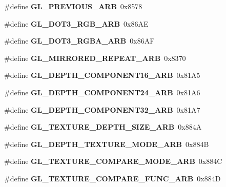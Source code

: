 \begin{DoxyCompactItemize}
\item 
\#define {\bfseries G\+L\+\_\+\+P\+R\+E\+V\+I\+O\+U\+S\+\_\+\+A\+R\+B}~0x8578\label{_s_d_l__opengl_8h_a24a4ee159c9974051295a0950c76c865}

\item 
\#define {\bfseries G\+L\+\_\+\+D\+O\+T3\+\_\+\+R\+G\+B\+\_\+\+A\+R\+B}~0x86\+A\+E\label{_s_d_l__opengl_8h_a8129362f88866ded868ebba6630b073c}

\item 
\#define {\bfseries G\+L\+\_\+\+D\+O\+T3\+\_\+\+R\+G\+B\+A\+\_\+\+A\+R\+B}~0x86\+A\+F\label{_s_d_l__opengl_8h_a198597e26e0321ba98c303b2fa218be7}

\item 
\#define {\bfseries G\+L\+\_\+\+M\+I\+R\+R\+O\+R\+E\+D\+\_\+\+R\+E\+P\+E\+A\+T\+\_\+\+A\+R\+B}~0x8370\label{_s_d_l__opengl_8h_a2c7182f052dec2409bdcf35ccd753bc9}

\item 
\#define {\bfseries G\+L\+\_\+\+D\+E\+P\+T\+H\+\_\+\+C\+O\+M\+P\+O\+N\+E\+N\+T16\+\_\+\+A\+R\+B}~0x81\+A5\label{_s_d_l__opengl_8h_a6d78bd241e215a14f1aee776d501bc3c}

\item 
\#define {\bfseries G\+L\+\_\+\+D\+E\+P\+T\+H\+\_\+\+C\+O\+M\+P\+O\+N\+E\+N\+T24\+\_\+\+A\+R\+B}~0x81\+A6\label{_s_d_l__opengl_8h_a720637b12a359130c68d2b5598c78e68}

\item 
\#define {\bfseries G\+L\+\_\+\+D\+E\+P\+T\+H\+\_\+\+C\+O\+M\+P\+O\+N\+E\+N\+T32\+\_\+\+A\+R\+B}~0x81\+A7\label{_s_d_l__opengl_8h_a80f92da69c84a61253b06ebec99d2900}

\item 
\#define {\bfseries G\+L\+\_\+\+T\+E\+X\+T\+U\+R\+E\+\_\+\+D\+E\+P\+T\+H\+\_\+\+S\+I\+Z\+E\+\_\+\+A\+R\+B}~0x884\+A\label{_s_d_l__opengl_8h_a7ab9cb0cb0d6d0e00b6bebc2007cbc7f}

\item 
\#define {\bfseries G\+L\+\_\+\+D\+E\+P\+T\+H\+\_\+\+T\+E\+X\+T\+U\+R\+E\+\_\+\+M\+O\+D\+E\+\_\+\+A\+R\+B}~0x884\+B\label{_s_d_l__opengl_8h_a2b2854f413bbf9d2e9cf2ab18a0e754d}

\item 
\#define {\bfseries G\+L\+\_\+\+T\+E\+X\+T\+U\+R\+E\+\_\+\+C\+O\+M\+P\+A\+R\+E\+\_\+\+M\+O\+D\+E\+\_\+\+A\+R\+B}~0x884\+C\label{_s_d_l__opengl_8h_ad09367a91fb405c54c1d121ed3b8beae}

\item 
\#define {\bfseries G\+L\+\_\+\+T\+E\+X\+T\+U\+R\+E\+\_\+\+C\+O\+M\+P\+A\+R\+E\+\_\+\+F\+U\+N\+C\+\_\+\+A\+R\+B}~0x884\+D\label{_s_d_l__opengl_8h_a61b39b4b4bdda3a8d403050f45dbe59b}


\end{DoxyCompactItemize}
